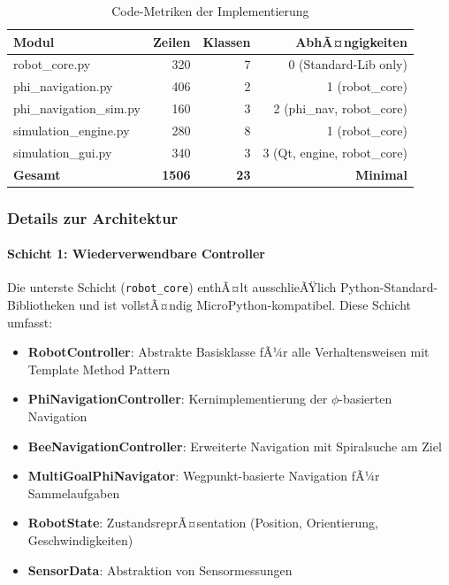 ﻿\documentclass[a4paper,12pt]{article}
\theoremstyle{definition}
\begin{document}
\begin{table}[H]
	\centering
	\caption{Code-Metriken der Implementierung}
	\label{tab:code_metrics}
	\begin{tabular}{lrrr}
		\toprule
		\textbf{Modul} & \textbf{Zeilen} & \textbf{Klassen} & \textbf{AbhÃ¤ngigkeiten} \\
		\midrule
		robot\_core.py & 320 & 7 & 0 (Standard-Lib only) \\
		phi\_navigation.py & 406 & 2 & 1 (robot\_core) \\
		phi\_navigation\_sim.py & 160 & 3 & 2 (phi\_nav, robot\_core) \\
		simulation\_engine.py & 280 & 8 & 1 (robot\_core) \\
		simulation\_gui.py & 340 & 3 & 3 (Qt, engine, robot\_core) \\
		\midrule
		\textbf{Gesamt} & \textbf{1506} & \textbf{23} & \textbf{Minimal} \\
		\bottomrule
	\end{tabular}
\end{table}

\subsubsection{Details zur Architektur}

\paragraph{Schicht 1: Wiederverwendbare Controller}

Die unterste Schicht (\texttt{robot\_core}) enthÃ¤lt ausschlieÃŸlich Python-Standard-Bibliotheken und ist vollstÃ¤ndig MicroPython-kompa\-tibel. Diese Schicht umfasst:

\begin{itemize}
	\item \textbf{RobotController}: Abstrakte Basisklasse fÃ¼r alle Verhaltensweisen mit Template Method Pattern
	\item \textbf{PhiNavigationController}: Kernimplementierung der $\phi$-basierten Navigation
	\item \textbf{BeeNavigationController}: Erweiterte Navigation mit Spiralsuche am Ziel
	\item \textbf{MultiGoalPhiNavigator}: Wegpunkt-basierte Navigation fÃ¼r Sammelaufgaben
	\item \textbf{RobotState}: ZustandsreprÃ¤sentation (Position, Orientierung, Geschwindigkeiten)
	\item \textbf{SensorData}: Abstraktion von Sensormessungen
\end{itemize}
\end{document}
